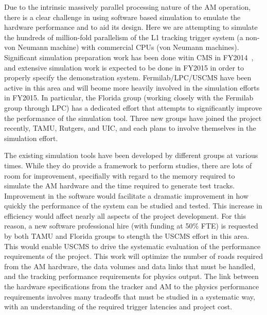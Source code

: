Due to the intrinsic massively parallel processing nature of the AM operation, there is a clear challenge in using software based simulation to emulate the hardware performance and to aid its design. Here we are attempting to simulate the hundreds of million-fold parallelism of the L1 tracking trigger system (a non-von Neumann machine) with commercial CPUs (von Neumann machines).
Significant simulation preparation work has been done witin CMS in FY2014~\cite{bib:AM-CAMP}, and extensive simulation work is expected to be done in FY2015 in order to properly specify the demonstration system.  Fermilab/LPC/USCMS have been active in this area and will beome more heavily involved in the simulation efforts in FY2015. In particular, the Florida group (working closely with the Fermilab group through LPC) has a dedicated effort that attempts to significantly improve the performance of the simulation tool.
Three new groups have joined the project recently, TAMU, Rutgers, and UIC, and each plans to involve themselves in the simulation effort.

The existing simulation tools have been developed by different groups at various times. While they do provide a framework to perform studies, there are lots of room for improvement, specifially with regard to the memory required to simulate the AM hardware and the time required to generate test tracks. Improvement in the software would facilitate a dramatic improvement in how quickly the performance of the system can be studied and tested. This increase in efficiency would affect nearly all aspects of the project development. For this reason, a new software professional hire (with funding at 50\% FTE) is requested by both TAMU and Florida groups to stength the USCMS effort in this area. This would enable USCMS to drive the systematic evaluation of the performance requirements of the project. This work will optimize the number of roads required from the AM hardware, the data volumes and data links that must be handled, and the tracking performance requirements for physics output. The link between the hardware specifications from the tracker and AM to the physics performance requirements involves many tradeoffs that must be studied in a systematic way, with an understanding of the required trigger latencies and project cost. 


